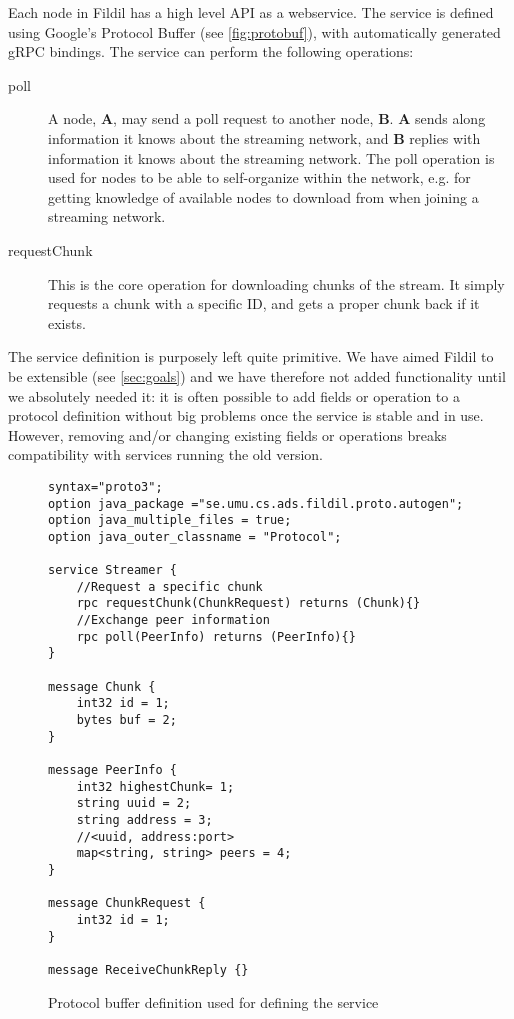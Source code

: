 \documentclass[10pt, a4paper]{article}
\begin{document}
Each node in Fildil has a high level API as a webservice. The service
is defined using Google's Protocol Buffer (see
\autoref{fig:protobuf}), with automatically generated gRPC
bindings. The service can perform the following operations:

\begin{description}
\item[poll] A node, \textbf{A}, may send a poll request to another
  node, \textbf{B}. \textbf{A} sends along information it knows about
  the streaming network, and \textbf{B} replies with information it
  knows about the streaming network. The poll operation is used for
  nodes to be able to self-organize within the network, e.g. for
  getting knowledge of available nodes to download from when joining a
  streaming network.
\item[requestChunk] This is the core operation for downloading chunks
  of the stream. It simply requests a chunk with a specific ID, and
  gets a proper chunk back if it exists.
\end{description}

The service definition is purposely left quite primitive. We have
aimed Fildil to be extensible (see \autoref{sec:goals}) and we have
therefore not added functionality until we absolutely needed it: it is
often possible to add fields or operation to a protocol definition
without big problems once the service is stable and in use. However,
removing and/or changing existing fields or operations breaks
compatibility with services running the old version.

\begin{figure}[H]
\begin{verbatim}
syntax="proto3";
option java_package ="se.umu.cs.ads.fildil.proto.autogen";
option java_multiple_files = true;
option java_outer_classname = "Protocol";

service Streamer {
    //Request a specific chunk
    rpc requestChunk(ChunkRequest) returns (Chunk){}
    //Exchange peer information
    rpc poll(PeerInfo) returns (PeerInfo){}
}

message Chunk {
    int32 id = 1;
    bytes buf = 2;
}

message PeerInfo {
    int32 highestChunk= 1;
    string uuid = 2;
    string address = 3;
    //<uuid, address:port>
    map<string, string> peers = 4;
}

message ChunkRequest {
    int32 id = 1;
}

message ReceiveChunkReply {}
\end{verbatim}
\caption{Protocol buffer definition used for defining the service}
\label{fig:protobuf}
\end{figure}
\end{document}
